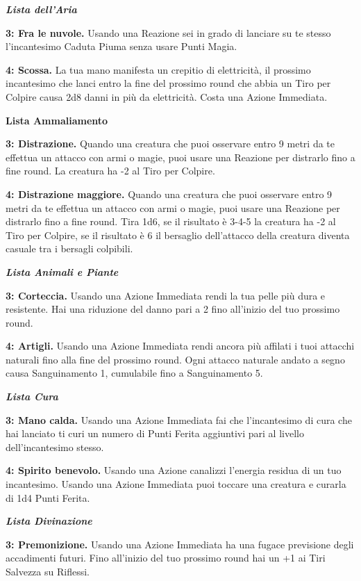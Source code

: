 \begin{multicols}{2}
\emph{\textbf{Lista dell'Aria}}

\textbf{3: Fra le nuvole.} Usando una Reazione sei in grado di lanciare su te stesso l'incantesimo Caduta Piuma senza usare Punti Magia.

\textbf{4: Scossa.} La tua mano manifesta un crepitio di elettricità, il prossimo incantesimo che lanci entro la fine del prossimo round che abbia un Tiro per Colpire causa 2d8 danni in più da elettricità. Costa una Azione Immediata.

\textbf{Lista Ammaliamento}

\textbf{3: Distrazione.} Quando una creatura che puoi osservare entro 9 metri da te effettua un attacco con armi o magie, puoi usare una Reazione per distrarlo fino a fine round. La creatura ha -2 al Tiro per Colpire.

\textbf{4: Distrazione maggiore.} Quando una creatura che puoi osservare entro 9 metri da te effettua un attacco con armi o magie, puoi usare una Reazione per distrarlo fino a fine round. Tira 1d6, se il risultato è 3-4-5 la creatura ha -2 al Tiro per Colpire, se il risultato è 6 il bersaglio dell'attacco della creatura diventa casuale tra i bersagli colpibili.

\emph{\textbf{Lista Animali e Piante}}

\textbf{3: Corteccia.} Usando una Azione Immediata rendi la tua pelle più dura e resistente. Hai una riduzione del danno pari a 2 fino all'inizio del tuo prossimo round.

\textbf{4: Artigli.} Usando una Azione Immediata rendi ancora più affilati i tuoi attacchi naturali fino alla fine del prossimo round. Ogni attacco naturale andato a segno causa Sanguinamento 1, cumulabile fino a Sanguinamento 5.

\emph{\textbf{Lista Cura}}

\textbf{3: Mano calda.} Usando una Azione Immediata fai che l'incantesimo di cura che hai lanciato ti curi un numero di Punti Ferita aggiuntivi pari al livello dell'incantesimo stesso.

\textbf{4: Spirito benevolo.} Usando una Azione canalizzi l'energia residua di un tuo incantesimo. Usando una Azione Immediata puoi toccare una creatura e curarla di 1d4 Punti Ferita.

\emph{\textbf{Lista Divinazione}}

\textbf{3: Premonizione.} Usando una Azione Immediata ha una fugace previsione degli accadimenti futuri. Fino all'inizio del tuo prossimo round hai un +1 ai Tiri Salvezza su Riflessi.


\end{multicols}
